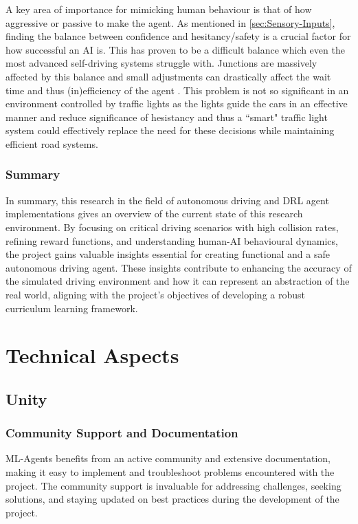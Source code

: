 \documentclass{article}
\begin{document}
A key area of importance for mimicking human behaviour is that of how aggressive or passive to make the agent. As mentioned in \ref{sec:Sensory-Inputs}, finding the balance between confidence and hesitancy/safety is a crucial factor for how successful an AI is. This has proven to be a difficult balance which even the most advanced self-driving systems struggle with. Junctions are massively affected by this balance and small adjustments can drastically affect the wait time and thus (in)efficiency of the agent \cite{Predictive-reward-function-for-ai-driving}. This problem is not so significant in an environment controlled by traffic lights as the lights guide the cars in an effective manner and reduce significance of hesistancy and thus a ``smart" traffic light system could effectively replace the need for these decisions while maintaining efficient road systems.

\subsubsection{Summary}
In summary, this research in the field of autonomous driving and DRL agent implementations gives an overview of the current state of this research environment. By focusing on critical driving scenarios with high collision rates, refining reward functions, and understanding human-AI behavioural dynamics, the project gains valuable insights essential for creating functional and a safe autonomous driving agent. These insights contribute to enhancing the accuracy of the simulated driving environment and how it can represent an abstraction of the real world, aligning with the project's objectives of developing a robust curriculum learning framework.


\section{Technical Aspects}
\lipsum[2][1]

\subsection{Unity}

\subsubsection{Community Support and Documentation}
ML-Agents benefits from an active community and extensive documentation, making it easy to implement and troubleshoot problems encountered with the project. The community support is invaluable for addressing challenges, seeking solutions, and staying updated on best practices during the development of the project.
\end{document}
